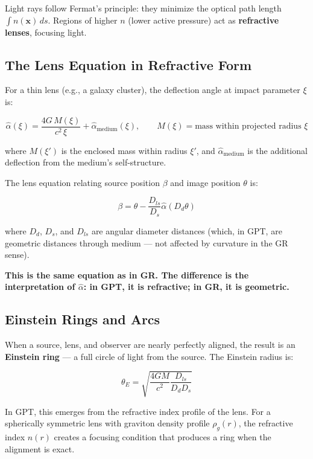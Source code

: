 \documentclass[12pt, a4paper]{article}
\begin{document}
Light rays follow Fermat's principle: they minimize the optical path length \( \int n(\mathbf{x}) \, ds \). Regions of higher \( n \) (lower active pressure) act as \textbf{refractive lenses}, focusing light.

\subsection{The Lens Equation in Refractive Form}
\label{subsec:lens_equation}

For a thin lens (e.g., a galaxy cluster), the deflection angle at impact parameter \( \xi \) is:

\[
\hat{\alpha}(\xi) = \frac{4G\,M(\xi)}{c^2\,\xi} + \hat{\alpha}_{\text{medium}}(\xi), \qquad M(\xi) = \text{mass within projected radius } \xi
\]

where \( M(\xi') \) is the enclosed mass within radius \( \xi' \), and \( \hat{\alpha}_{\text{medium}} \) is the additional deflection from the medium's self-structure.

The lens equation relating source position \( \beta \) and image position \( \theta \) is:

\[
\beta = \theta - \frac{D_{ls}}{D_s} \hat{\alpha}(D_d \theta)
\]

where \( D_d \), \( D_s \), and \( D_{ls} \) are angular diameter distances (which, in GPT, are geometric distances through medium — not affected by curvature in the GR sense).

\textbf{This is the same equation as in GR. The difference is the interpretation of \( \hat{\alpha} \): in GPT, it is refractive; in GR, it is geometric.}

\subsection{Einstein Rings and Arcs}
\label{subsec:einstein_rings}

When a source, lens, and observer are nearly perfectly aligned, the result is an \textbf{Einstein ring} — a full circle of light from the source. The Einstein radius is:

\[
\theta_E = \sqrt{\frac{4GM}{c^2} \frac{D_{ls}}{D_d D_s}}
\]

In GPT, this emerges from the refractive index profile of the lens. For a spherically symmetric lens with graviton density profile \( \rho_g(r) \), the refractive index \( n(r) \) creates a focusing condition that produces a ring when the alignment is exact.
\end{document}

